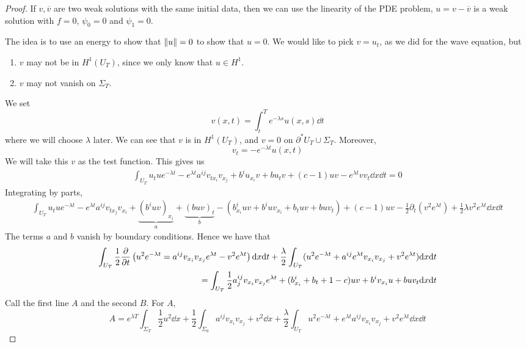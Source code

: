 \documentclass{article}
\begin{document}
\begin{proof}
    If \(v, \overline v\) are two weak solutions with the same initial data, then we can use the linearity of the PDE problem, \(u = v - \overline v\) is a weak solution with \(f = 0\), \(\psi_0 = 0\) and \(\psi_1 = 0\).

    The idea is to use an energy to show that \(\norm{u} = 0\) to show that \(u = 0\). We would like to pick \(v = u_t\), as we did for the wave equation, but
    \begin{enumerate}
        \item \(v\) may not be in \(H^1(U_T)\), since we only know that \(u \in H^1\).
        \item \(v\) may not vanish on \(\Sigma_T\).
    \end{enumerate}
    We set
    \[v(x, t) = \int_t^T e^{-\lambda s}u(x, s)\dd t\]
    where we will choose \(\lambda\) later. We can see that \(v\) is in \(H^1(U_T)\), and \(v = 0\) on \(\partial^*U_T \cup \Sigma_T\). Moreover,
    \[v_t = -e^{-\lambda t}u(x, t)\]
    We will take this \(v\) as the test function. This gives us
    \begin{align*}
        \int_{U_T}u_t ue^{-\lambda t} - e^{\lambda t}a^{ij}v_{tx_i}v_{x_j} + b^iu_{x_i}v + bu_t v + (c - 1)uv - e^{\lambda t}v v_t\dd x \dd t = 0
    \end{align*}
    Integrating by parts,
    \begin{align*}
        \int_{U_T}u_tue^{-\lambda t} - e^{\lambda t}a^{ij}v_{tx_j}v_{x_i} + \underbrace{(b^iu v)_{x_i}}_a + \underbrace{(buv)_t}_b - (b^i_{x_i}uv + b^iuv_{x_i} + b_tuv + buv_t) + (c-1)uv - \frac{1}{2}\partial_t(v^2e^{\lambda t}) + \frac{1}{2}\lambda v^2e^{\lambda t}\dd x \dd t
    \end{align*}
    The terms \(a\) and \(b\) vanish by boundary conditions. Hence we have that
    \begin{align*}
        \int_{U_T}\frac{1}{2}\pdv{t}\left(u^2e^{-\lambda t} = a^{ij}v_{x_i}v_{x_j}e^{\lambda t} - v^2e^{\lambda t}\right)\dd x \dd t + \frac{\lambda}{2}\int_{U_T}(u^2 e^{-\lambda t} + a^{ij}e^{\lambda t}v_{x_i}v_{x_j} + v^2e^{\lambda t}) \dd x \dd t \\
        = \int_{U_T}\frac{1}{2}a^{ij}_j v_{x_i}v_{x_j}e^{\lambda t} + (b^i_{x_i} + b_t + 1 - c)uv + b^iv_{x_i}u + buv_t \dd x \dd t 
    \end{align*}
    Call the first line \(A\) and the second \(B\). For \(A\),
    \[A = e^{\lambda T}\int_{\Sigma_T}\frac{1}{2}u^2 \dd x + \frac{1}{2}\int_{\Sigma_0}a^{ij} v_{x_i}v_{x_j} + v^2 \dd x + \frac{\lambda}{2}\int_{U_T}u^2e^{-\lambda t} + e^{\lambda t}a^{ij}v_{x_i}v_{x_j} + v^2 e^{\lambda t}\dd x \dd t\]

\end{proof}
\end{document}
